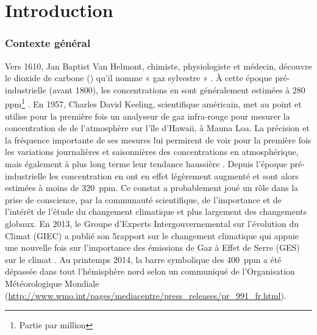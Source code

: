 
\chapter*{Introduction}
\newpage


\subsection*{Contexte général}

Vers 1610, Jan Baptist Van Helmont, chimiste, physiologiste et médecin, découvre le dioxide de carbone (\coo) qu'il nomme « gaz sylvestre » \citep{philippedesouabe-zyriane1988}.
À cette époque pré-industrielle (avant 1800), les concentrations en \coo sont généralement estimées à 280 ppm\footnote{Partie par million} \citep{Siegenthaler1987}.
En 1957, Charles David Keeling, scientifique américain, met au point et utilise pour la première fois un analyseur de gaz infra-rouge pour mesurer la concentration de \coo de l'atmosphère sur l'île d'Hawaii, à Mauna Loa.
La précision et la fréquence importante de ses mesures lui permirent de voir pour la première fois les variations journalières et saisonnières des concentrations en \coo atmosphérique, mais également à plus long terme leur tendance haussière \citep{harris2010}.
Depuis l'époque pré-industrielle les concentration en \coo ont en effet légèrement augmenté et sont alors estimées à moins de \SI{320}{ppm}.
Ce constat a probablement joué un rôle dans la prise de conscience, par la communauté scientifique, de l'importance et de l'intérêt de l'étude du changement climatique et plus largement des changements globaux.
En 2013, le Groupe d'Experts Intergouvernemental sur l'évolution du Climat (GIEC) a publié son 5\ieme rapport sur le changement climatique qui appuie une nouvelle fois sur l'importance des émissions de Gaz à Effet de Serre (GES) sur le climat \citep{stocker2013}.
Au printemps 2014, la barre symbolique des \SI{400}{ppm} a été dépassée dans tout l'hémisphère nord selon un communiqué de l'Organisation Météorologique Mondiale (\url{http://www.wmo.int/pages/mediacentre/press_releases/pr_991_fr.html}).


